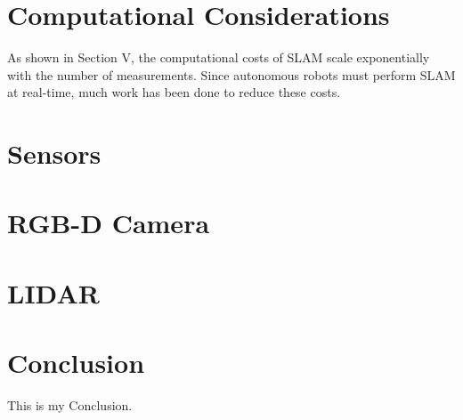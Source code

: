 \documentclass[10pt,conference]{ieeeconf}
\begin{document}
\section {Computational Considerations}

	As shown in Section V, the computational costs of SLAM scale exponentially with the number of measurements. Since autonomous robots must perform SLAM at real-time, much work has been done to reduce these costs.
	
	
	
	
	
	
	
\section {Sensors}

	\section {RGB-D Camera}
	
	\section {LIDAR}


\section {Conclusion}
    This is my Conclusion.




\end{document}
